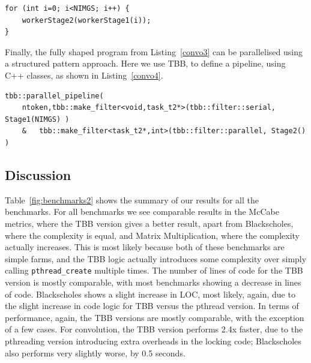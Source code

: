 \begin{lstlisting}[label=convo3,caption={Convolution Shaped},frame=single]
for (int i=0; i<NIMGS; i++) {
	workerStage2(workerStage1(i));
}
\end{lstlisting}

\noindent
Finally, the fully shaped program from Listing~\ref{convo3} can be parallelised using a structured pattern approach. Here we use TBB, to define a pipeline, using C++ classes, as shown in Listing~\ref{convo4}.


\begin{lstlisting}[label=convo4, caption={Convolution Restored with TBB},frame=single]
tbb::parallel_pipeline(
	ntoken,tbb::make_filter<void,task_t2*>(tbb::filter::serial, Stage1(NIMGS) )
	& 	tbb::make_filter<task_t2*,int>(tbb::filter::parallel, Stage2() )
\end{lstlisting}

\subsection{Discussion}

Table~\ref{fig:benchmarks2} shows the summary of our results for all the benchmarks. For all benchmarks we see comparable results in the McCabe metrics, where the TBB version gives a better result, apart from Blackscholes, where the complexity is equal, and Matrix Multiplication, where the complexity actually increases. This is most likely because both of these benchmarks are simple farms, and the TBB logic actually introduces some complexity over simply calling \lstinline{pthread_create} multiple times. The number of lines of code for the TBB version is mostly comparable, with most benchmarks showing a decrease in lines of code. Blackscholes shows a slight increase in LOC, most likely, again, due to the slight increase in code logic for TBB versus the pthread version. In terms of performance, again, the TBB versions are mostly comparable, with the exception of a few cases. For convolution, the TBB version performs 2.4x faster, due to the pthreading version introducing extra overheads in the locking code; Blackscholes also performs very slightly worse, by 0.5 seconds. 

